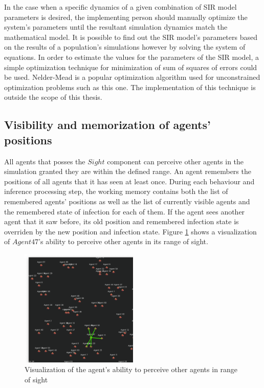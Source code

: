In the case when a specific dynamics of a given combination of SIR model parameters is desired, the implementing person should manually optimize the system's parameters until the resultant simulation dynamics match the mathematical model.
It is possible to find out the SIR model's parameters based on the results of a population's simulations however by solving the system of equations.
In order to estimate the values for the parameters of the SIR model, a simple optimization technique for minimization of sum of squares of errors could be used.
Nelder-Mead is a popular optimization algorithm used for unconstrained optimization problems such as this one\cite{singer2009nelder}.
The implementation of this technique is outside the scope of this thesis.

\subsection{Visibility and memorization of agents' positions}

All agents that posses the $Sight$ component can perceive other agents in the simulation granted they are within the defined range.
An agent remembers the positions of all agents that it has seen at least once.
During each behaviour and inference processing step, the working memory contains both the list of remembered agents' positions as well as the list of currently visible agents and the remembered state of infection for each of them.
If the agent sees another agent that it saw before, its old position and remembered infection state is overriden by the new position and infection state.
Figure \ref{fig:images/visibility/agent47.png} shows a visualization of $Agent47$'s ability to perceive other agents in its range of sight.

\begin{figure}[H]
    \centering
    \includegraphics[width=0.5\textwidth]{images/visibility/agent47.png}
    \caption{Visualization of the agent's ability to perceive other agents in range of sight}\label{fig:images/visibility/agent47.png}
\end{figure}

